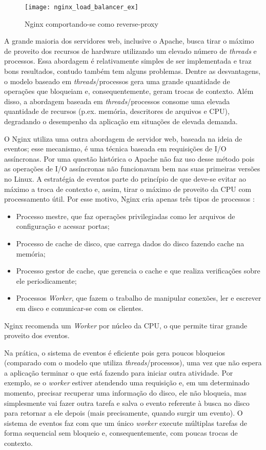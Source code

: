 \begin{figure}[!h]
  \centering
  \texttt{[image: nginx\_load\_balancer\_ex]} 
  \caption[Nginx comportando-se como reverse-proxy]{Nginx comportando-se como reverse-proxy \citep{soni}}
  \label{fig:nginx_basico} 
\end{figure}

A grande maioria dos servidores web, inclusive o Apache, busca tirar o máximo
de proveito dos recursos de hardware utilizando um elevado número de
\emph{threads} e processos. Essa abordagem é relativamente simples de ser
implementada e traz bons resultados, contudo também tem alguns problemas.
Dentre as desvantagens, o modelo baseado em \emph{threads}/processos gera uma
grande quantidade de operações que bloqueiam e, consequentemente, geram trocas
de contexto. Além disso, a abordagem baseada em \emph{threads}/processos
consome uma elevada quantidade de recursos (p.ex. memória, descritores de
arquivos e CPU), degradando o desempenho da aplicação em situações de elevada
demanda.

O Nginx utiliza uma outra abordagem de servidor web, baseada na ideia de eventos;
esse mecanismo, é uma técnica baseada em requisições de I/O assíncronas. Por
uma questão histórica o Apache não faz uso desse método pois as operações de
I/O assíncronas não funcionavam bem nas suas primeiras versões no Linux. A
estratégia de eventos parte do princípio de que deve-se evitar ao máximo a
troca de contexto e, assim, tirar o máximo de proveito da CPU com processamento
útil.  Por esse motivo, Nginx cria apenas três tipos de processos
\citep{nginx_architecture}:

\begin{itemize}
  \item Processo mestre, que faz operações privilegiadas como ler arquivos de configuração e acessar portas;
  \item Processo de cache de disco, que carrega dados do disco fazendo cache na memória;
  \item Processo gestor de cache, que gerencia o cache e que realiza verificações sobre ele periodicamente;
  \item Processos \emph{Worker}, que fazem o trabalho de manipular conexões, ler e escrever em disco e comunicar-se com os clientes.
\end{itemize}

Nginx recomenda um \emph{Worker} por núcleo da CPU, o que permite tirar
grande proveito dos eventos.

Na prática, o sistema de eventos é eficiente pois gera poucos bloqueios
(comparado com o modelo que utiliza \emph{threads}/processos), uma vez que não espera
a aplicação terminar o que está fazendo para iniciar outra atividade. Por
exemplo, se o \emph{worker} estiver atendendo uma requisição e, em um
determinado momento, precisar recuperar uma informação do disco, ele não
bloqueia, mas simplesmente vai fazer outra tarefa e salva o evento referente à
busca no disco para retornar a ele depois (mais precisamente, quando surgir um
evento). O sistema de eventos faz com que um único \emph{worker} execute
múltiplas tarefas de forma sequencial sem bloqueio e, consequentemente, com
poucas trocas de contexto.

